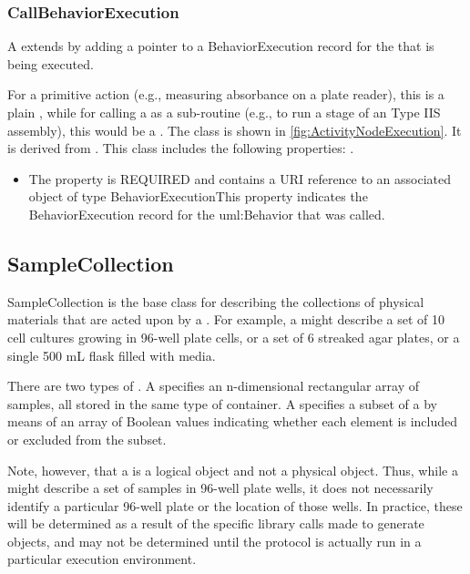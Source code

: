 \subsubsection{CallBehaviorExecution}%
\label{sec:labop:CallBehaviorExecution}%
A  extends  by adding a pointer to a BehaviorExecution
        record for the  that is being executed.

        For a primitive action (e.g., measuring absorbance on a plate reader), this is a plain ,
        while for calling a  as a sub-routine (e.g., to run a stage of an Type IIS assembly), this would be a
        .%
\newline%
\linebreak%
The  class is shown in \ref{fig:ActivityNodeExecution}. It is derived from .%
This class includes the following properties: . %
\begin{itemize}%
\item%
The  property is REQUIRED and contains a URI reference to an associated object of type BehaviorExecutionThis property indicates the BehaviorExecution record for the uml:Behavior that was called.%
\end{itemize}%
\subsection{SampleCollection}%
\label{sec:labop:SampleCollection}%
SampleCollection is the base class for describing the collections of physical materials that are
         acted upon by a . For example, a  might describe a set of 10 cell cultures growing in
         96-well plate cells, or a set of 6 streaked agar plates, or a single 500 mL flask filled with media.

         There are two types of . A  specifies an n-dimensional rectangular array of samples,
         all stored in the same type of container. A  specifies a subset of a  by means of an
         array of Boolean values indicating whether each element is included or excluded from the subset.

         Note, however, that a  is a logical object and not a physical object. Thus, while a
          might describe a set of samples in 96-well plate wells, it does not necessarily identify
         a particular 96-well plate or the location of those wells.  In practice, these will be determined as a
         result of the specific library calls made to generate  objects, and may not be determined
         until the protocol is actually run in a particular execution environment.

